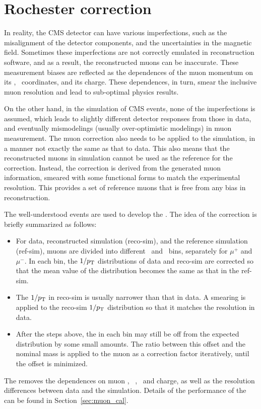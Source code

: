 \section{Rochester correction} \label{sec:Roch_corr}

In reality, the CMS detector can have various imperfections, 
such as the misalignment of the detector components, and the uncertainties in the magnetic field.
Sometimes these imperfections are not correctly emulated in reconstruction software, 
and as a result, the reconstructed muons can be inaccurate.
These measurement biases are reflected as the dependences of the muon momentum on its \eta, \phi ~coordinates, and its charge.
These dependences, in turn, smear the inclusive muon resolution and lead to sub-optimal physics results.

On the other hand, in the simulation of CMS events, none of the imperfections is assumed,
which leads to slightly different detector responses from those in data, and eventually mismodelings (usually over-optimistic modelings) in muon measurement. 
The muon correction also needs to be applied to the simulation, in a manner not exactly the same as that to data.
This also means that the reconstructed muons in simulation cannot be used as the reference for the correction.
Instead, the correction is derived from the generated muon information, smeared with some functional forms to match the experimental resolution.
This provides a set of reference muons that is free from any bias in reconstruction. 

The well-understood \zmm events are used to develop the \RochCorr. 
The idea of the correction is briefly summarized as follows:
\begin{itemize}
  \item For data, reconstructed simulation (reco-sim), and the reference simulation (ref-sim), 
        muons are divided into different \eta ~and \phi ~bins, separately for $\mu^{+}$ and $\mu^{-}$.
        In each bin, the $1/p_{\mathrm{T}}$ distributions of data and reco-sim are corrected so that the mean value of the distribution becomes the same as that in the ref-sim.
  \item The $1/p_{\mathrm{T}}$ in reco-sim is usually narrower than that in data. 
        A smearing is applied to the reco-sim $1/p_{\mathrm{T}}$ distribution so that it matches the resolution in data.
  \item After the steps above, the \mmm in each bin may still be off from the expected distribution by some small amounts.
        The ratio between this offset and the nominal \PZ mass is applied to the muon \pt as a correction factor iteratively, until the offset is minimized.
\end{itemize}
The \RochCorr removes the \mmm dependences on muon \eta,~ \phi,~ and charge, 
as well as the \mmm resolution differences between data and the simulation.
Details of the performance of the \RochCorr can be found in Section~\ref{sec:muon_cal}.


